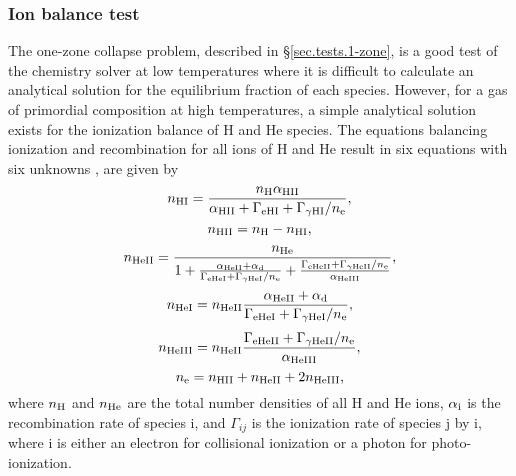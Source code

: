 \subsubsection{Ion balance test}
\label{sec.tests.ionbalance}

The one-zone collapse problem, described in \S\ref{sec.tests.1-zone},
is a good test of the chemistry solver at low temperatures where it is
difficult to calculate an analytical solution for the equilibrium
fraction of each species.  However, for a gas of primordial composition
at high temperatures, a simple analytical solution exists for the
ionization balance of H and He species.  The equations balancing
ionization and recombination for all ions of H and He result in six
equations with six unknowns \citep[e.g.,][]{1996ApJS..105...19K}, are
given by
\begin{equation} \label{eq:eqnHI}
n_{\rm HI} = \frac{n_{\rm H} \alpha_{\rm HII}}{\alpha_{\rm HII}
+ \Gamma_{\rm eHI} + \Gamma_{\gamma \rm HI} / n_{\rm e}},
\end{equation}
\begin{equation}
n_{\rm HII} = n_{\rm H} - n_{\rm HI},
\end{equation}
\begin{equation}
n_{\rm HeII} = \frac{n_{\rm He}}{1 + \frac{\alpha_{\rm HeII}
+ \alpha_{\rm d}}{\Gamma_{\rm eHeI} + \Gamma_{\gamma \rm HeI} / n_{\rm
e}} + \frac{\Gamma_{\rm eHeII} + \Gamma_{\gamma \rm HeII} / n_{\rm
e}}{\alpha_{\rm HeIII}}},
\end{equation}
\begin{equation}
n_{\rm HeI} = n_{\rm HeII} \frac{\alpha_{\rm HeII} + \alpha_{\rm
d}}{\Gamma_{\rm eHeI} + \Gamma_{\gamma \rm HeI} / n_{\rm e}},
\end{equation}
\begin{equation}
n_{\rm HeIII} = n_{\rm HeII} \frac{\Gamma_{\rm eHeII}
+ \Gamma_{\rm \gamma \rm HeII} / n_{\rm e}}{\alpha_{\rm HeIII}},
\end{equation}
\begin{equation} \label{eq:eqne}
n_{\rm e} = n_{\rm HII} + n_{\rm HeII} + 2 n_{\rm HeIII},
\end{equation}
where $n_{\rm H}$ and $n_{\rm He}$ are the total number densities of
all H and He ions, $\alpha_{\rm i}$ is the recombination rate of
species i, and $\Gamma_{ij}$ is the ionization rate of species j by
i, where i is either an electron for collisional ionization or a
photon for photo-ionization.


